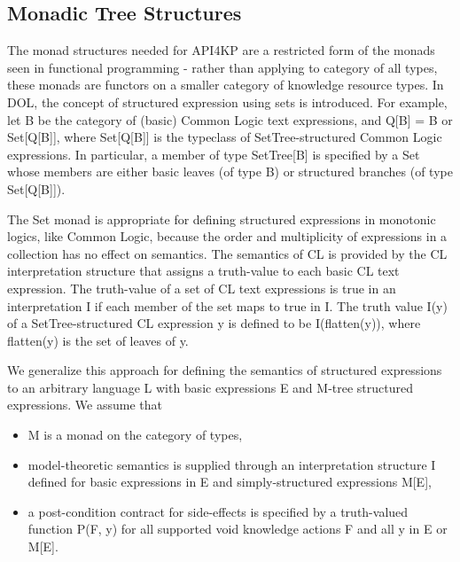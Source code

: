\documentclass[runningheads]{llncs}
\begin{document}
\subsection{Monadic Tree Structures}
The monad structures needed for API4KP are a restricted form of the monads seen in functional programming - rather than applying to category of all types, these monads are functors on a smaller category of knowledge resource types. In DOL, the concept of structured expression using sets is introduced. For example, let B be the category of (basic) Common Logic text expressions, and Q[B] = B or Set[Q[B]], where Set[Q[B]] is the typeclass of SetTree-structured Common Logic expressions. In particular, a member of type SetTree[B] is specified by a Set whose members are either  basic leaves (of type B) or structured branches (of type Set[Q[B]]). 

The Set monad is appropriate for defining structured expressions in monotonic logics, like Common Logic, because the order and multiplicity of expressions in a collection has no effect on semantics. The semantics of CL is provided by the CL interpretation structure that assigns a truth-value to each basic CL text expression. The truth-value of a set of CL text expressions is true in an interpretation I if each member of the set maps to true in I. The truth value I(y) of a SetTree-structured CL expression y is defined to be I(flatten(y)), where flatten(y) is the set of leaves of y.

We generalize this approach for defining the semantics of structured expressions to an arbitrary language L with basic expressions E and M-tree structured expressions. We assume that 
\begin{itemize}
\item M is a monad on the category of types,
\item model-theoretic semantics is supplied through an interpretation structure I defined for basic expressions in E and simply-structured expressions M[E],
\item a post-condition contract for side-effects is specified by a truth-valued function P(F, y) for all supported void knowledge actions F and all y in E or M[E].
\end{itemize}
\end{document}
